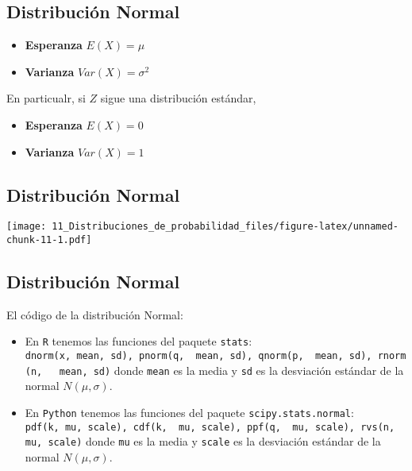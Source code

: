 \documentclass[
]{article}
\providecommand{\tightlist}{%
  \setlength{\itemsep}{0pt}\setlength{\parskip}{0pt}}
\begin{document}
\hypertarget{distribuciuxf3n-normal-1}{%
\subsection{Distribución Normal}\label{distribuciuxf3n-normal-1}}

\begin{itemize}
\tightlist
\item
  \textbf{Esperanza} \(E(X) = \mu\)
\item
  \textbf{Varianza} \(Var(X) = \sigma^2\)
\end{itemize}

En particualr, si \(Z\) sigue una distribución estándar,

\begin{itemize}
\tightlist
\item
  \textbf{Esperanza} \(E(X) = 0\)
\item
  \textbf{Varianza} \(Var(X) = 1\)
\end{itemize}

\hypertarget{distribuciuxf3n-normal-2}{%
\subsection{Distribución Normal}\label{distribuciuxf3n-normal-2}}

\texttt{[image: 11\_Distribuciones\_de\_probabilidad\_files/figure-latex/unnamed-chunk-11-1.pdf]}

\hypertarget{distribuciuxf3n-normal-3}{%
\subsection{Distribución Normal}\label{distribuciuxf3n-normal-3}}

El código de la distribución Normal:

\begin{itemize}
\tightlist
\item
  En \texttt{R} tenemos las funciones del paquete \texttt{stats}:
  \texttt{dnorm(x,\ mean,\ sd),\ pnorm(q,\ \ mean,\ sd),\ qnorm(p,\ \ mean,\ sd),\ rnorm(n,\ \ \ mean,\ sd)}
  donde \texttt{mean} es la media y \texttt{sd} es la desviación
  estándar de la normal \(N(\mu, \sigma)\).
\item
  En \texttt{Python} tenemos las funciones del paquete
  \texttt{scipy.stats.normal}:
  \texttt{pdf(k,\ mu,\ scale),\ cdf(k,\ \ mu,\ scale),\ ppf(q,\ \ mu,\ scale),\ rvs(n,\ \ mu,\ scale)}
  donde \texttt{mu} es la media y \texttt{scale} es la desviación
  estándar de la normal \(N(\mu, \sigma)\).
\end{itemize}
\end{document}
